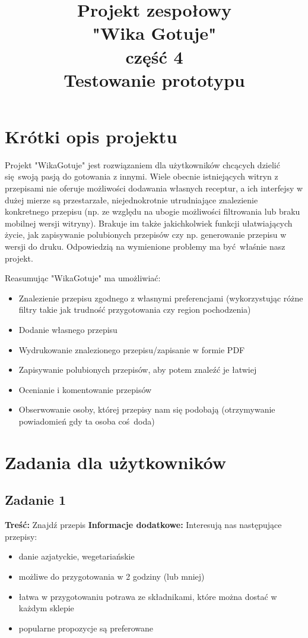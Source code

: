 \documentclass{article}
\title{\fontsize{20}{22}\selectfont Projekt zespołowy\\ "Wika Gotuje" \\ część 4\\Testowanie prototypu}
\begin{document}
\section{Krótki opis projektu}
Projekt "WikaGotuje" jest rozwiązaniem dla użytkowników chcących dzielić się swoją pasją do gotowania z innymi. Wiele obecnie istniejących witryn z przepisami nie oferuje możliwości
dodawania własnych receptur, a ich interfejsy w dużej mierze są przestarzałe, niejednokrotnie utrudniające znalezienie konkretnego przepisu (np. ze względu na ubogie możliwości
filtrowania lub braku mobilnej wersji witryny). Brakuje im także jakichkolwiek funkcji ułatwiających życie, jak zapisywanie polubionych przepisów czy np. generowanie
przepisu w wersji do druku. Odpowiedzią na wymienione problemy ma być właśnie nasz projekt.\newline

Reasumując "WikaGotuje" ma umożliwiać:
\begin{itemize}
  \item Znalezienie przepisu zgodnego z własnymi preferencjami (wykorzystując różne filtry takie jak trudność przygotowania czy region pochodzenia)
  \item Dodanie własnego przepisu
  \item Wydrukowanie znalezionego przepisu/zapisanie w formie PDF
  \item Zapisywanie polubionych przepisów, aby potem znaleźć je łatwiej
  \item Ocenianie i komentowanie przepisów
  \item Obserwowanie osoby, której przepisy nam się podobają (otrzymywanie powiadomień gdy ta osoba coś doda)
\end{itemize}

\section{Zadania dla użytkowników}
\subsection{Zadanie 1}
\textbf{Treść:} Znajdź przepis\newline
\textbf{Informacje dodatkowe:} Interesują nas następujące przepisy:
\begin{itemize}
  \item danie azjatyckie, wegetariańskie
  \item możliwe do przygotowania w 2 godziny (lub mniej)
  \item łatwa w przygotowaniu potrawa ze składnikami, które można dostać w każdym sklepie
  \item popularne propozycje są preferowane
\end{itemize}
\end{document}
